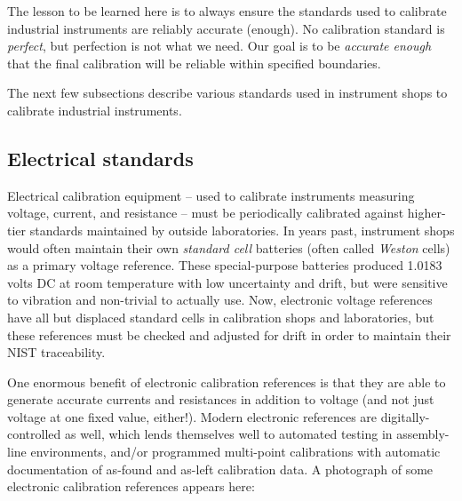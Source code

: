 The lesson to be learned here is to always ensure the standards used to calibrate industrial instruments are reliably accurate (enough).  No calibration standard is \textit{perfect}, but perfection is not what we need.  Our goal is to be \textit{accurate enough} that the final calibration will be reliable within specified boundaries.

\vskip 10pt

The next few subsections describe various standards used in instrument shops to calibrate industrial instruments.





\filbreak
\subsection{Electrical standards}

Electrical calibration equipment -- used to calibrate instruments measuring voltage, current, and resistance -- must be periodically calibrated against higher-tier standards maintained by outside laboratories.  In years past, instrument shops would often maintain their own \textit{standard cell} batteries (often called \textit{Weston} cells) as a primary voltage reference.  These special-purpose batteries produced 1.0183 volts DC at room temperature with low uncertainty and drift, but were sensitive to vibration and non-trivial to actually use.  Now, electronic voltage references have all but displaced standard cells in calibration shops and laboratories, but these references must be checked and adjusted for drift in order to maintain their NIST traceability.   

One enormous benefit of electronic calibration references is that they are able to generate accurate currents and resistances in addition to voltage (and not just voltage at one fixed value, either!).  Modern electronic references are digitally-controlled as well, which lends themselves well to automated testing in assembly-line environments, and/or programmed multi-point calibrations with automatic documentation of as-found and as-left calibration data.  A photograph of some electronic calibration references appears here:

